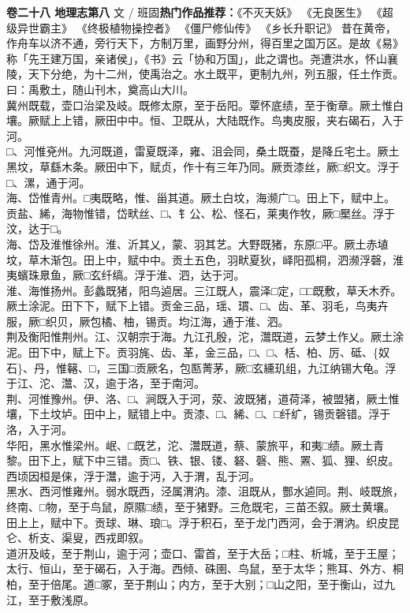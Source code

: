 \documentclass[]{article}
\begin{document}
\textbf{卷二十八 地理志第八} 文 /
班固\textbf{热门作品推荐：}《不灭天妖》 《无良医生》 《超级异世霸主》
《终极植物操控者》 《僵尸修仙传》 《乡长升职记》
昔在黄帝，作舟车以济不通，旁行天下，方制万里，画野分州，得百里之国万区。是故《易》称「先王建万国，亲诸侯」，《书》云「协和万国」，此之谓也。尧遭洪水，怀山襄陵，天下分绝，为十二州，使禹治之。水土既平，更制九州，列五服，任土作贡。\\
曰：禹敷土，随山刊木，奠高山大川。\\
冀州既载，壶口治梁及岐。既修太原，至于岳阳。覃怀底绩，至于衡章。厥土惟白壤。厥赋上上错，厥田中中。恒、卫既从，大陆既作。鸟夷皮服，夹右碣石，入于河。\\
□、河惟兗州。九河既道，雷夏既泽，雍、沮会同，桑土既蚕，是降丘宅土。厥土黑坟，草繇木条。厥田中下，赋贞，作十有三年乃同。厥贡漆丝，厥□织文。浮于□、漯，通于河。\\
海、岱惟青州。□夷既略，惟、甾其道。厥土白坟，海濒广□。田上下，赋中上。贡盐、絺，海物惟错，岱畎丝、□、钅公、松、怪石，莱夷作牧，厥□檿丝。浮于汶，达于□。\\
海、岱及淮惟徐州。淮、沂其乂，蒙、羽其艺。大野既猪，东原□平。厥土赤埴坟，草木渐包。田上中，赋中中。贡土五色，羽畎夏狄，峄阳孤桐，泗濒浮磬，淮夷蠙珠臮鱼，厥□玄纤缟。浮于淮、泗，达于河。\\
淮、海惟扬州。彭蠡既猪，阳鸟逌居。三江既人，震泽□定，□□既敷，草夭木乔。厥土涂泥。田下下，赋下上错。贡金三品，瑶、瑻、□、齿、革、羽毛，鸟夷卉服，厥□织贝，厥包橘、柚，锡贡。均江海，通于淮、泗。\\
荆及衡阳惟荆州。江、汉朝宗于海。九江孔殷，沱，灊既道，云梦土作乂。厥土涂泥。田下中，赋上下。贡羽旄、齿、革，金三品，□、□、栝、柏、厉、砥、\{奴石\}、丹，惟簵、□，三国□贡厥名，包匦菁茅，厥□玄纁玑组，九江纳锡大龟。浮于江、沱、灊、汉，逾于洛，至于南河。\\
荆、河惟豫州。伊、洛、□、涧既入于河，荥、波既猪，道荷泽，被盟猪，厥土惟壤，下土坟垆。田中上，赋错上中。贡漆、□、絺、□、□纤纩，锡贡磬错。浮于洛，入于河。\\
华阳，黑水惟梁州。岷、□既艺，沱、灊既道，蔡、蒙旅平，和夷□绩。厥土青黎。田下上，赋下中三错。贡□、铁、银、镂、砮、磬、熊、罴、狐、狸、织皮。西顷因桓是俫，浮于灊，逾于沔，入于渭，乱于河。\\
黑水、西河惟雍州。弱水既西，泾属渭汭。漆、沮既从，酆水逌同。荆、岐既旅，终南、□物，至于鸟鼠，原隰□绩，至于猪野。三危既宅，三苗丕叙。厥土黄壤。田上上，赋中下。贡球、琳、琅□。浮于积石，至于龙门西河，会于渭汭。织皮昆仑、析支、渠叟，西戎即叙。\\
道汧及岐，至于荆山，逾于河；壶口、雷首，至于大岳；□柱、析城，至于王屋；太行、恒山，至于碣石，入于海。西倾、硃圉、鸟鼠，至于太华；熊耳、外方、桐柏，至于倍尾。道□冢，至于荆山；内方，至于大别；□山之阳，至于衡山，过九江，至于敷浅原。\\
\end{document}
